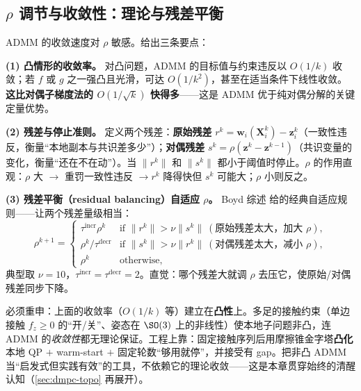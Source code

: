 \subsection{\texorpdfstring{$\rho$}{rho} 调节与收敛性：理论与残差平衡}
\label{sec:dmpc-rho}

ADMM 的收敛速度对 $\rho$ 敏感。给出三条要点：

\textbf{(1) 凸情形的收敛率。} 对凸问题，ADMM 的目标值与约束违反以 $O(1/k)$ 收敛；若 $f$ 或 $g$ 之一强凸且光滑，可达 $O(1/k^2)$，甚至在适当条件下线性收敛。\textbf{这比对偶子梯度法的 $O(1/\sqrt k)$ 快得多}——这是 ADMM 优于纯对偶分解的关键定量优势\cite{boyd2011admm}。

\textbf{(2) 残差与停止准则。} 定义两个残差：\textbf{原始残差} $r^k=\mathbf{w}_i(\mathbf{X}_i^k)-\mathbf{z}_i^k$（一致性违反，衡量“本地副本与共识差多少”）；\textbf{对偶残差} $s^k=\rho(\mathbf{z}^k-\mathbf{z}^{k-1})$（共识变量的变化，衡量“还在不在动”）。当 $\|r^k\|$ 和 $\|s^k\|$ 都小于阈值时停止。$\rho$ 的作用直观：$\rho$ 大 $\to$ 重罚一致性违反 $\to r^k$ 降得快但 $s^k$ 可能大；$\rho$ 小则反之。

\textbf{(3) 残差平衡（residual balancing）自适应 $\rho$。} Boyd 综述\cite{boyd2011admm} 给的经典自适应规则——让两个残差量级相当：
\begin{equation}
  \rho^{k+1}=\begin{cases}\tau^{\text{incr}}\rho^k & \text{if } \|r^k\|>\nu\|s^k\|\ (\text{原始残差太大，加大 }\rho),\\[2pt] \rho^k/\tau^{\text{decr}} & \text{if } \|s^k\|>\nu\|r^k\|\ (\text{对偶残差太大，减小 }\rho),\\[2pt] \rho^k & \text{otherwise},\end{cases}
  \label{eq:dmpc-residual-balance}
\end{equation}
典型取 $\nu=10$，$\tau^{\text{incr}}=\tau^{\text{decr}}=2$。直觉：哪个残差大就调 $\rho$ 去压它，使原始/对偶残差同步下降。

\begin{insight}\label{ins:dmpc-nonconvex}
必须重申：上面的收敛率（$O(1/k)$ 等）建立在\textbf{凸性}上。多足的接触约束（单边接触 $f_z\ge0$ 的“开/关”、姿态在 $\SO(3)$ 上的非线性）使本地子问题非凸，连 ADMM 的\emph{收敛性}都无理论保证。工程上靠：固定接触序列后用摩擦锥金字塔\textbf{凸化}本地 QP $+$ warm-start $+$ 固定轮数“够用就停”，并接受有 gap。把非凸 ADMM 当“启发式但实践有效”的工具，不依赖它的理论收敛——这是本章贯穿始终的清醒认知（\cref{sec:dmpc-topo} 再展开）。
\end{insight}

